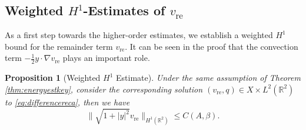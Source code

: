 \documentclass[12pt]{amsart}
\numberwithin{equation}{section}              %
\newtheorem{proposition}{Proposition}[section]
\theoremstyle{remark}
\begin{document}
		\subsection{Weighted $H^1$-Estimates of $v_{\text{re}}$}
		As a first step towards the higher-order estimates, we establish a weighted $H^1$ bound for the remainder term $v_{\text{re}}$. It can be seen in the proof that the convection term $-\frac{1}{2}y\cdot \nabla v_{\text{re}}$ plays an important role.
		\begin{proposition}[Weighted $H^1$ Estimate] \label{prop:weighted_H1est}
            Under the same assumption of Theorem \ref{thm:energyestkey},
			consider the corresponding solution $(v_{\text{re}}, q) \in X \times L^2(\mathbb{R}^2)$  to
			\eqref{eq:differencereca}, then 
			we have
			\begin{equation} \label{eq:weighted_H1_bound}
				\| \sqrt{1+|y|^2} v_{\text{re}} \|_{H^1(\mathbb{R}^2)} \le C(A,\beta).
			\end{equation}
		\end{proposition}
		
\end{document}

